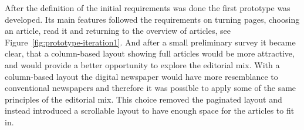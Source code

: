 After the definition of the initial requirements was done the first prototype was developed. Its main features followed the requirements on turning pages, choosing an article, read it and returning to the overview of articles, see Figure~\ref{fig:prototype-iteration1}. And after a small preliminary survey it became clear, that a column-based layout showing full articles would be more attractive, and would provide a better opportunity to explore the editorial mix. With a column-based layout the digital newspaper would have more resemblance to conventional newspapers and therefore it was possible to apply some of the same principles of the editorial mix. This choice removed the paginated layout and instead introduced a scrollable layout to have enough space for the articles to fit in.
\begin{figure}%
\end{figure}

